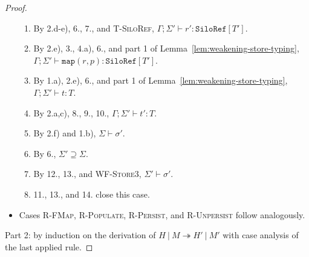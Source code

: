 \begin{proof}
\begin{itemize}
\begin{enumerate}
\item By 2.d-e), 6., 7., and \textsc{T-SiloRef}, $\Gamma ; \Sigma' \vdash r' : \texttt{SiloRef}[T']$.
\item By 2.e), 3., 4.a), 6., and part 1 of Lemma~\ref{lem:weakening-store-typing}, $\Gamma ; \Sigma' \vdash \texttt{map}(r, p) : \texttt{SiloRef}[T']$.
\item By 1.a), 2.e), 6., and part 1 of Lemma~\ref{lem:weakening-store-typing}, $\Gamma ; \Sigma' \vdash t : T$.
\item By 2.a,c), 8., 9., 10., $\Gamma ; \Sigma' \vdash t' : T$.
\item By 2.f) and 1.b), $\Sigma \vdash \sigma'$.
\item By 6., $\Sigma' \supseteq \Sigma$.
\item By 12., 13., and \textsc{WF-Store3}, $\Sigma' \vdash \sigma'$.
\item 11., 13., and 14. close this case.
\end{enumerate}

\item Cases \textsc{R-FMap}, \textsc{R-Populate}, \textsc{R-Persist}, and \textsc{R-Unpersist} follow analogously.
\end{itemize}

%
Part 2: by induction on the derivation of $H~|~M \twoheadrightarrow H'~|~M'$ with case analysis of the last applied rule.


\end{proof}

